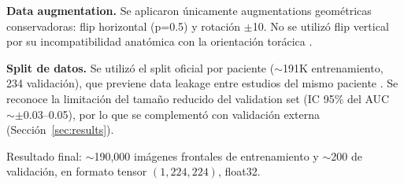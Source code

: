 \textbf{Data augmentation.} Se aplicaron \'unicamente augmentations geom\'etricas conservadoras: flip horizontal (p=0.5) y rotaci\'on $\pm$10\textdegree. No se utiliz\'o flip vertical por su incompatibilidad anat\'omica con la orientaci\'on tor\'acica \cite{calli2021deep}.

\textbf{Split de datos.} Se utiliz\'o el split oficial por paciente \cite{garbin2021datasheet} ($\sim$191K entrenamiento, 234 validaci\'on), que previene data leakage entre estudios del mismo paciente \cite{rouzrokh2022mitigating}. Se reconoce la limitaci\'on del tama\~no reducido del validation set (IC 95\% del AUC $\sim\pm$0.03--0.05), por lo que se complement\'o con validaci\'on externa (Secci\'on~\ref{sec:results}).

Resultado final: $\sim$190,000 im\'agenes frontales de entrenamiento y $\sim$200 de validaci\'on, en formato tensor $(1, 224, 224)$, float32.
